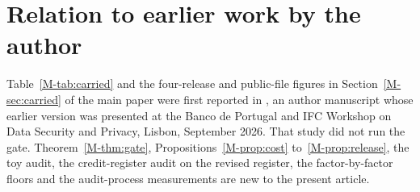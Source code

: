 \documentclass{jpc}
\begin{document}
\section{Relation to earlier work by the author}\label{sec:s-overlap}
Table~\ref{M-tab:carried} and the four-release and public-file figures in Section~\ref{M-sec:carried} of the main paper were first reported in \cite{mahomane2026}, an author manuscript whose earlier version was presented at the Banco de Portugal and IFC Workshop on Data Security and Privacy, Lisbon, September 2026. That study did not run the gate. Theorem~\ref{M-thm:gate}, Propositions~\ref{M-prop:cost} to~\ref{M-prop:release}, the toy audit, the credit-register audit on the revised register, the factor-by-factor floors and the audit-process measurements are new to the present article.



\def\publicsearchtable{../generated/table_public_search}
\def\publicsearchllmtable{../generated/table_public_search_llm}

\end{document}
